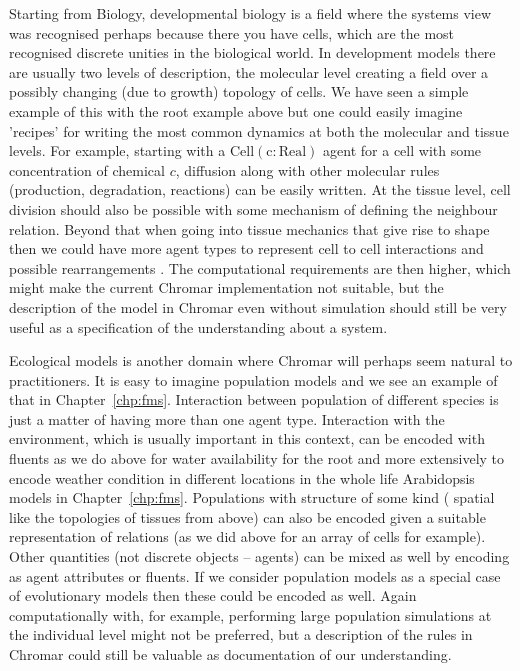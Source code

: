 Starting from Biology, developmental biology is a field where the systems view
was recognised perhaps because there you have cells, which are the most
recognised discrete unities in the biological world. In development models there
are usually two levels of description, the molecular level creating a field over
a possibly changing (\eg due to growth) topology of cells. We have seen a simple
example of this with the root example above but one could easily imagine
'recipes' for writing the most common dynamics at both the molecular and tissue
levels. For example, starting with a $\mathrm{Cell(c : \mathrm{Real})}$ agent
for a cell with some concentration of chemical $c$, diffusion along with other
molecular rules (production, degradation, reactions) can be easily written. At
the tissue level, cell division should also be possible with some mechanism of
defining the neighbour relation. Beyond that when going into tissue mechanics
that give rise to shape \citep[morphodynamics, see for example for
plants;][]{formosa-jordan2018} then we could have more agent types to represent
cell to cell interactions and possible rearrangements \citep{fletcher2014vertex,
  farhadifar2007influence}. The computational requirements are then higher,
which might make the current Chromar implementation not suitable, but the
description of the model in Chromar even without simulation should still be very
useful as a specification of the understanding about a system.

Ecological models is another domain where Chromar will perhaps seem natural to
practitioners. It is easy to imagine population models and we see an example of
that in Chapter~\ref{chp:fms}. Interaction between population of different
species is just a matter of having more than one agent type. Interaction with
the environment, which is usually important in this context, can be encoded with
fluents as we do above for water availability for the root and more extensively
to encode weather condition in different locations in the whole life Arabidopsis
models in Chapter~\ref{chp:fms}. Populations with structure of some kind (\eg
spatial like the topologies of tissues from above) can also be encoded given a
suitable representation of relations (as we did above for an array of cells for
example). Other quantities (\ie not discrete objects -- agents) can be mixed as
well by encoding as agent attributes or fluents. If we consider population
models as a special case of evolutionary models \citep{doebeli_towards_2017}
then these could be encoded as well. Again computationally with, for example,
performing large population simulations at the individual level might not be
preferred, but a description of the rules in Chromar could still be valuable as
documentation of our understanding.

